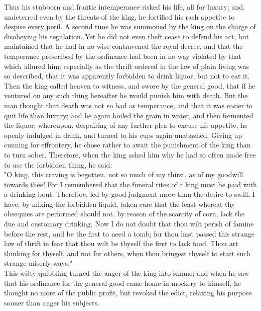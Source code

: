 \documentclass[10pt,a4paper]{report}
\begin{document}
Thus his stubborn and frantic intemperance risked his life, all for luxury; and, undeterred even by the threats of the king, he fortified his rash appetite to despise every peril. A second time he was summoned by the king on the charge of disobeying his regulation. Yet he did not even theft cease to defend his act, but maintained that he had in no wise contravened the royal decree, and that the temperance prescribed by the ordinance had been in no way violated by that which allured him; especially as the thrift ordered in the law of plain living was so described, that it was apparently forbidden to drink liquor, but not to eat it. Then the king called heaven to witness, and swore by the general good, that if he ventured on any such thing hereafter he would punish him with death. But the man thought that death was not so bad as temperance, and that it was easier to quit life than luxury; and he again boiled the grain in water, and then fermented the liquor; whereupon, despairing of any further plea to excuse his appetite, he openly indulged in drink, and turned to his cups again unabashed. Giving up cunning for effrontery, he chose rather to await the punishment of the king than to turn sober. Therefore, when the king asked him why he had so often made free to use the forbidden thing, he said:\\

"O king, this craving is begotten, not so much of my thirst, as of my goodwill towards thee! For I remembered that the funeral rites of a king must be paid with a drinking-bout. Therefore, led by good judgment more than the desire to swill, I have, by mixing the forbidden liquid, taken care that the feast whereat thy obsequies are performed should not, by reason of the scarcity of corn, lack the due and customary drinking. Now I do not doubt that thou wilt perish of famine before the rest, and be the first to need a tomb; for thou hast passed this strange law of thrift in fear that thou wilt be thyself the first to lack food. Thou art thinking for thyself, and not for others, when thou bringest thyself to start such strange miserly ways."\\

This witty quibbling turned the anger of the king into shame; and when he saw that his ordinance for the general good came home in mockery to himself, he thought no more of the public profit, but revoked the edict, relaxing his purpose sooner than anger his subjects.\\
\end{document}
